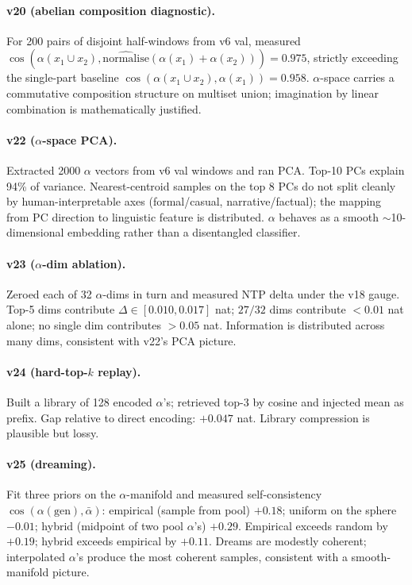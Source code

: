 \documentclass[11pt, a4paper]{article}
\theoremstyle{plain}
\theoremstyle{definition}
\theoremstyle{remark}
\begin{document}
\paragraph{v20 (abelian composition diagnostic).}
For 200 pairs of disjoint half-windows from v6 val, measured $\cos(\alpha(x_1 \cup x_2), \hat{\mathrm{normalise}}(\alpha(x_1) + \alpha(x_2))) = 0.975$, strictly exceeding the single-part baseline $\cos(\alpha(x_1 \cup x_2), \alpha(x_1)) = 0.958$.
$\alpha$-space carries a commutative composition structure on multiset union; imagination by linear combination is mathematically justified.

\paragraph{v22 ($\alpha$-space PCA).}
Extracted 2000 $\alpha$ vectors from v6 val windows and ran PCA.
Top-10 PCs explain 94\% of variance.
Nearest-centroid samples on the top 8 PCs do not split cleanly by human-interpretable axes (formal/casual, narrative/factual); the mapping from PC direction to linguistic feature is distributed.
$\alpha$ behaves as a smooth $\sim$10-dimensional embedding rather than a disentangled classifier.

\paragraph{v23 ($\alpha$-dim ablation).}
Zeroed each of 32 $\alpha$-dims in turn and measured NTP delta under the v18 gauge. Top-5 dims contribute $\Delta \in [0.010, 0.017]$ nat; $27/32$ dims contribute $<0.01$ nat alone; no single dim contributes $>0.05$ nat.
Information is distributed across many dims, consistent with v22's PCA picture.

\paragraph{v24 (hard-top-$k$ replay).}
Built a library of 128 encoded $\alpha$'s; retrieved top-3 by cosine and injected mean as prefix.
Gap relative to direct encoding: $+0.047$ nat. Library compression is plausible but lossy.

\paragraph{v25 (dreaming).}
Fit three priors on the $\alpha$-manifold and measured self-consistency $\cos(\alpha(\mathrm{gen}), \bar\alpha)$:
empirical (sample from pool) $+0.18$; uniform on the sphere $-0.01$; hybrid (midpoint of two pool $\alpha$'s) $+0.29$.
Empirical exceeds random by $+0.19$; hybrid exceeds empirical by $+0.11$.
Dreams are modestly coherent; interpolated $\alpha$'s produce the most coherent samples, consistent with a smooth-manifold picture.
\end{document}
